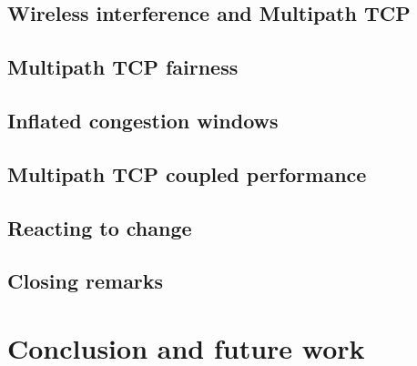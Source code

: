 \documentclass[12pt,a4paper]{article}
\begin{document}
\subsection{Wireless interference and Multipath TCP}
\label{sec:results-mptcp}

\FloatBarrier
\clearpage
\subsection{Multipath TCP fairness}
\label{sec:results-fairness}

\FloatBarrier
\clearpage
\subsection{Inflated congestion windows}
\label{sec:results-inflated}

\FloatBarrier
\clearpage
\subsection{Multipath TCP coupled performance}
\label{sec:results-performance}

\FloatBarrier
\clearpage
\subsection{Reacting to change}
\label{sec:results-reacting}

\FloatBarrier
\clearpage
\subsection{Closing remarks}
\label{sec:results-closing-remarks}

\FloatBarrier

\clearpage
\section{Conclusion and future work}
\label{sec:conclusion}

\end{document}
